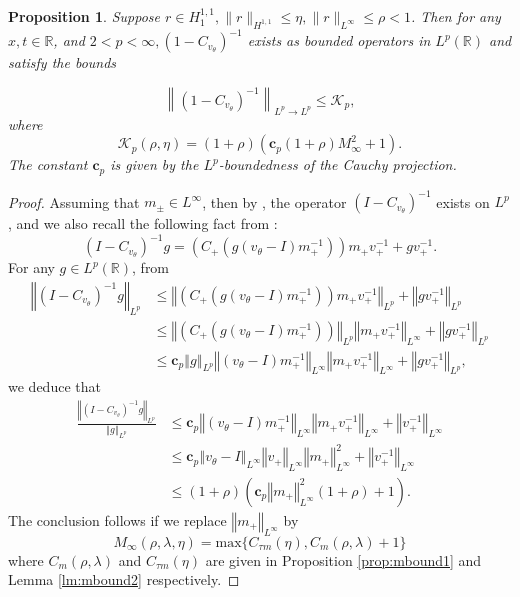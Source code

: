\documentclass{amsart}
\theoremstyle{plain}
\newtheorem{proposition}[theorem]{Proposition}
\theoremstyle{remark}
\numberwithin{equation}{section}
\newcommand{\Red}[1]{{\color{red} #1}}
\newcommand{\norm}[2]{\left\Vert #1\right\Vert_{#2}}
\newcommand{\bbR}{\mathbb{R}}
\begin{document}
\begin{proposition}
\label{prop:new apriori}
  Suppose $r \in H_1^{1,1},\|r\|_{H^{1,1}} \leqslant \eta,\|r\|_{L^{\infty}} \leqslant \rho<1$. Then for any $x, t \in \mathbb{R}$, and $2<p<\infty,\left(1-C_{v_\theta}\right)^{-1}$  exists as bounded operators in $L^p(\mathbb{R})$ and satisfy the bounds

$$
\left\|\left(1-C_{v_\theta}\right)^{-1}\right\|_{L^p \rightarrow L^p} \leqslant\mathcal{K}_p,
$$
where
\begin{equation}
\label{Kp}
\mathcal{K}_p(\rho, \eta)=(1+\rho)\left(\mathbf{c}_p \left(1+\rho\right)M_{\infty}^2+1\right). 
\end{equation}
The constant $\mathbf{c}_p$ is given by the $L^p$-boundedness of the Cauchy projection.
\end{proposition}
\begin{proof}
Assuming that $m_\pm \in L^\infty$, then by \cite[Proposition 4.5, Proposition 2.6]{DZ-3}, the operator $ \left(I-C_{v_\theta}\right)^{-1} $ exists on $L^p$, and we also recall the following fact from \cite[(7.107)]{Deift}:
    \begin{equation}
        \left(I-C_{v_\theta}\right)^{-1} g=\left(C_{+}\left(g(v_\theta-I) m_{+}^{-1}\right)\right) m_{+} v_{+}^{-1}+g v_{+}^{-1}.
    \end{equation}
    For any $g\in L^p(\bbR)$, from
    \begin{align*}
        \norm{ \left(I-C_{v_\theta}\right)^{-1} g}{L^p}&\leq \norm{\left(C_{+}\left(g(v_\theta-I) m_{+}^{-1}\right)\right) m_{+} v_{+}^{-1}}{L^p}+\norm{g v_{+}^{-1}}{L^p}\\
        &\leq \norm{\left(C_{+}\left(g(v_\theta-I) m_{+}^{-1}\right)\right) }{L^p}\norm{m_{+} v_{+}^{-1}}{L^\infty}+\norm{g v_{+}^{-1}}{L^p}\\
        &\leq \mathbf{c}_p \norm{g}{L^p}\norm{(v_\theta-I) m_{+}^{-1}}{L^\infty} \norm{m_{+} v_{+}^{-1}}{L^\infty}+\norm{g v_{+}^{-1}}{L^p},
    \end{align*}
    we deduce that
    \begin{align}
        \frac{\norm{ \left(I-C_{v_\theta}\right)^{-1} g}{L^p}}{\norm{g}{L^p}}&\leq \mathbf{c}_p \norm{(v_\theta-I) m_{+}^{-1}}{L^\infty} \norm{m_{+} v_{+}^{-1}}{L^\infty}+\norm{v_{+}^{-1}}{L^\infty}\\
        \nonumber
        &\leq \mathbf{c}_p \norm{v_\theta-I}{L^\infty}\norm{v_+}{L^\infty}\norm{m_+}{L^\infty}^2+\norm{v_{+}^{-1}}{L^\infty}\\
        \nonumber
        &\leq (1+\rho)\left(\mathbf{c}_p\norm{m_+}{L^\infty}^2\left(1+\rho\right)+1\right).
    \end{align}
    The conclusion follows if we replace $\norm{m_+}{L^\infty}$ by 
    \begin{equation}
    \label{Minfty}
        M_{\infty}(\rho,\lambda, \eta)=\text{max}\lbrace  C_{\tau m}(\eta), C_m(\rho, \lambda)+1\rbrace
    \end{equation}
   where $C_m(\rho, \lambda)$ and $C_{\tau m}(\eta)$ are given in Proposition \ref{prop:mbound1} and Lemma \ref{lm:mbound2} respectively.%
\end{proof}
\end{document}
